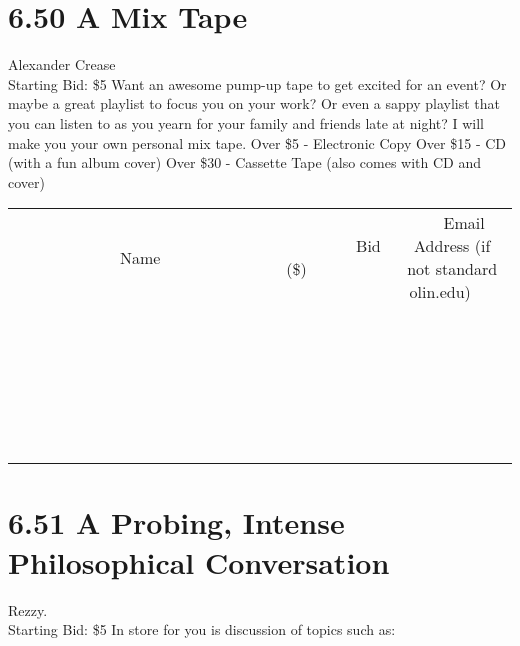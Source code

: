 \documentclass[11pt]{article}
\begin{document}
\section*{6.50 A Mix Tape}
Alexander Crease
\\
Starting Bid: \$5
\newline
Want an awesome pump-up tape to get excited for an event?
Or maybe a great playlist to focus you on your work?
Or even a sappy playlist that you can listen to as you yearn for your family and friends late at night?
I will make you your own personal mix tape.
Over \$5   - Electronic Copy
Over \$15 - CD (with a fun album cover)
Over \$30 - Cassette Tape (also comes with CD and cover)
\\[6ex]
\begin{tabular}{c c c}
~~~~~~~~~~~~~Name~~~~~~~~~~~~~ & ~~~~~~~~~Bid (\$)~~~~~~~~~  & ~~~Email Address (if not standard olin.edu)~~~\\
 & & \\
\hline
 & & \\
\hline
 & & \\
\hline
 & & \\
\hline
 & & \\
\hline
 & & \\
\hline
 & & \\
\hline
 & & \\
\hline
 & & \\
\hline
 & & \\
\hline
 & & \\
\hline
 & & \\
\hline
 & & \\
\hline
 & & \\
\hline
 & & \\
\hline
 & & \\
\hline
 & & \\
\hline
 & & \\
\hline
 & & \\
\hline
 & & \\
\hline
 & & \\
\hline
 & & \\
\hline
 & & \\
\hline
 & & \\
\hline
 & & \\
\hline
 & & \\
\hline
\end{tabular}
\newpage
\section*{6.51 A Probing, Intense Philosophical Conversation}
Rezzy.
\\
Starting Bid: \$5
\newline
In store for you is discussion of topics such as:
\end{document}
